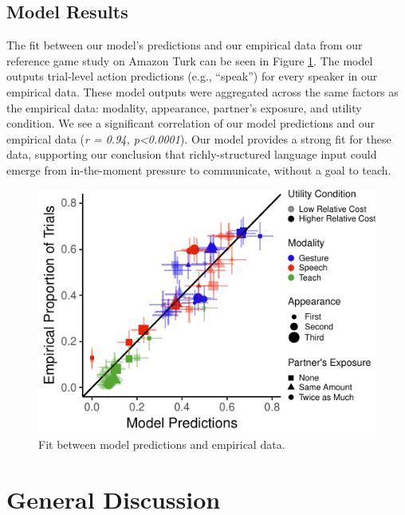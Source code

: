 \documentclass[10pt, letterpaper]{article}
\newenvironment{CodeChunk}{}{}
\begin{document}
\subsection{Model Results}\label{model-results}

The fit between our model's predictions and our empirical data from our
reference game study on Amazon Turk can be seen in Figure
\ref{fig:model_fit}. The model outputs trial-level action predictions
(e.g., ``speak'') for every speaker in our empirical data. These model
outputs were aggregated across the same factors as the empirical data:
modality, appearance, partner's exposure, and utility condition. We see
a significant correlation of our model predictions and our empirical
data (\emph{r = 0.94, p\textless{}0.0001}). Our model provides a strong
fit for these data, supporting our conclusion that richly-structured
language input could emerge from in-the-moment pressure to communicate,
without a goal to teach.

\begin{CodeChunk}
\begin{figure}[H]

{\centering \includegraphics{figs/model_fit-1} 

}

\caption[Fit between model predictions and empirical data]{Fit between model predictions and empirical data.}\label{fig:model_fit}
\end{figure}
\end{CodeChunk}

\section{General Discussion}\label{general-discussion}
\end{document}
